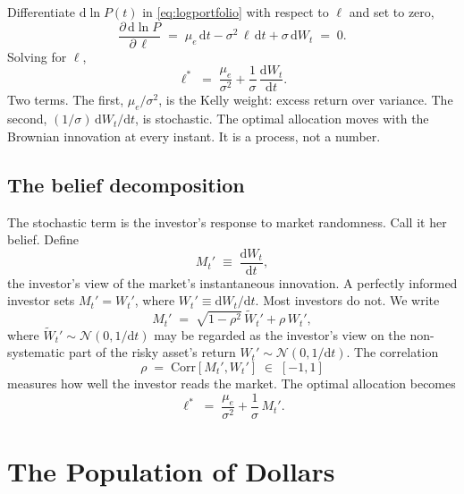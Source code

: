 \documentclass[11pt]{article}
\newcommand{\lopt}{\ell^{*}}
\newcommand{\mue}{\mu_{e}}
\newcommand{\Corr}{\mathrm{Corr}}
\newcommand{\dd}{\mathrm{d}}
\begin{document}
Differentiate $\dd\ln P(t)$ in \eqref{eq:logportfolio} with respect
to $\ell$ and set to zero,
\begin{equation}
  \frac{\partial\,\dd\ln P}{\partial\,\ell}
  \;=\; \mue\,\dd t - \sigma^{2}\,\ell\,\dd t
  + \sigma\,\dd W_{t} \;=\; 0.
  \label{eq:foc}
\end{equation}
Solving for $\ell$,
\begin{equation}
  \boxed{
  \lopt \;=\; \frac{\mue}{\sigma^{2}}
  + \frac{1}{\sigma}\,\frac{\dd W_{t}}{\dd t}.
  }
  \label{eq:lstar}
\end{equation}
Two terms. The first, $\mue/\sigma^{2}$, is the Kelly weight: excess return over variance. The second,
$(1/\sigma)\,\dd W_{t}/\dd t$, is stochastic. The optimal allocation
moves with the Brownian innovation at every instant. It is a process,
not a number.

\subsection{The belief decomposition}

The stochastic term is the investor's response to market randomness.
Call it her belief. Define
\begin{equation}
  M_{t}' \;\equiv\; \frac{\dd W_{t}}{\dd t},
  \label{eq:Mprime}
\end{equation}
the investor's view of the market's instantaneous innovation. A
perfectly informed investor sets $M_{t}' = W_{t}'$, where
$W_{t}' \equiv \dd W_{t}/\dd t$. Most investors do not. We write
\begin{equation}
  M_{t}' \;=\; \sqrt{1-\rho^{2}}\,\widetilde{W}_{t}'
  + \rho\,W_{t}',
  \label{eq:belief}
\end{equation}
where $\widetilde{W}_{t}' \sim \mathcal{N}(0, 1/\dd t)$ may be regarded as
the investor's view on the non-systematic part of the risky asset's return
$W_{t}' \sim \mathcal{N}(0, 1/\dd t)$. The correlation
\begin{equation}
  \rho \;=\; \Corr[M_{t}', W_{t}'] \;\in\; [-1, 1]
  \label{eq:rho}
\end{equation}
measures how well the investor reads the market. The optimal
allocation becomes
\begin{equation}
  \lopt \;=\; \frac{\mue}{\sigma^{2}}
  + \frac{1}{\sigma}\,M_{t}'.
  \label{eq:lstarM}
\end{equation}

\section{The Population of Dollars}
\end{document}
